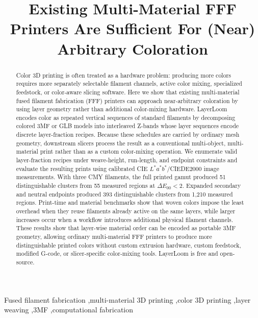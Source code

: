 \documentclass[5p,times,numbers]{elsarticle}
\begin{document}
\begin{frontmatter}


\title{Existing Multi-Material FFF Printers Are Sufficient For (Near) Arbitrary Coloration}

\begin{abstract}
Color 3D printing is often treated as a hardware problem: producing more colors requires more separately selectable filament channels, active color mixing, specialized feedstock, or color-aware slicing software. Here we show that existing multi-material fused filament fabrication (FFF) printers can approach near-arbitrary coloration by using layer geometry rather than additional color-mixing hardware. LayerLoom encodes color as repeated vertical sequences of standard filaments by decomposing colored 3MF or GLB models into interleaved Z-bands whose layer sequences encode discrete layer-fraction recipes. Because these schedules are carried by ordinary mesh geometry, downstream slicers process the result as a conventional multi-object, multi-material print rather than as a custom color-mixing operation. We enumerate valid layer-fraction recipes under weave-height, run-length, and endpoint constraints and evaluate the resulting prints using calibrated CIE \(L^*a^*b^*\)/CIEDE2000 image measurements. With three CMY filaments, the full printed gamut produced 51 distinguishable clusters from 55 measured regions at \(\Delta E_{00}<2\). Expanded secondary and neutral endpoints produced 393 distinguishable clusters from 1,210 measured regions. Print-time and material benchmarks show that woven colors impose the least overhead when they reuse filaments already active on the same layers, while larger increases occur when a workflow introduces additional physical filament channels. These results show that layer-wise material order can be encoded as portable 3MF geometry, allowing ordinary multi-material FFF printers to produce more distinguishable printed colors without custom extrusion hardware, custom feedstock, modified G-code, or slicer-specific color-mixing tools. LayerLoom is free and open-source.
\end{abstract}


\begin{keyword}
Fused filament fabrication \sep multi-material 3D printing \sep color 3D printing \sep layer weaving \sep 3MF \sep computational fabrication
\end{keyword}

\end{frontmatter}
\linenumbers
\end{document}
